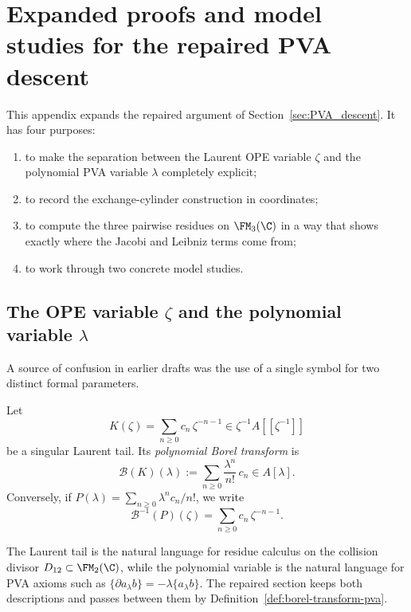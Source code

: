 
\section{Expanded proofs and model studies for the repaired PVA descent}
\label{app:pva-expanded-repaired}

This appendix expands the repaired argument of
Section~\ref{sec:PVA_descent}.  It has four purposes:

\begin{enumerate}[label=\textup{(\alph*)}]
\item to make the separation between the Laurent OPE variable $\zeta$ and the
      polynomial PVA variable $\lambda$ completely explicit;
\item to record the exchange-cylinder construction in coordinates;
\item to compute the three pairwise residues on $\FM_3(\C)$ in a way that shows
      exactly where the Jacobi and Leibniz terms come from;
\item to work through two concrete model studies.
\end{enumerate}

\subsection{The OPE variable $\zeta$ and the polynomial variable $\lambda$}

A source of confusion in earlier drafts was the use of a single symbol for two distinct
formal parameters.

\begin{definition}
\label{def:borel-transform-pva}
Let
\[
K(\zeta)=\sum_{n\ge0} c_n\,\zeta^{-n-1}\in \zeta^{-1}A[\![\zeta^{-1}]\!]
\]
be a singular Laurent tail.  Its \emph{polynomial Borel transform} is
\[
\mathcal B(K)(\lambda):=\sum_{n\ge0}\frac{\lambda^n}{n!}\,c_n\in A[\lambda].
\]
Conversely, if $P(\lambda)=\sum_{n\ge0}\lambda^n c_n/n!$, we write
\[
\mathcal B^{-1}(P)(\zeta)=\sum_{n\ge0} c_n\,\zeta^{-n-1}.
\]
\end{definition}

\begin{remark}
The Laurent tail is the natural language for residue calculus on the collision divisor
$D_{12}\subset\FM_2(\C)$, while the polynomial variable is the natural language for
PVA axioms such as
$\{\partial a_\lambda b\}=-\lambda\{a_\lambda b\}$.  The repaired section keeps both
descriptions and passes between them by Definition~\ref{def:borel-transform-pva}.
\end{remark}

